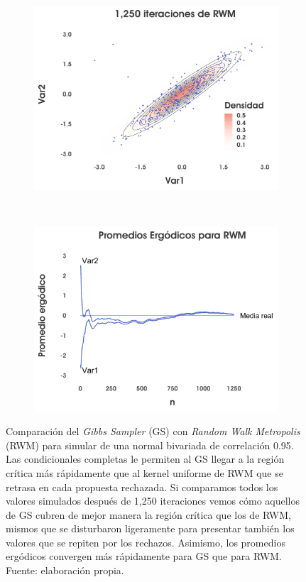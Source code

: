 \begin{figure}
\begin{subfigure}{0.31\textwidth}
        \includegraphics[width=\textwidth]{Figs/Bayes/Ejemplo_RWM_Compara2B}
    \end{subfigure}
    ~
    \begin{subfigure}{0.31\textwidth}
        \includegraphics[width=\textwidth]{Figs/Bayes/Ejemplo_RWM_Compara2C}
    \end{subfigure}
    \caption{Comparación del \textit{Gibbs Sampler} (GS) con \textit{Random Walk Metropolis} (RWM) para simular de una normal bivariada de correlación 0.95. Las condicionales completas le permiten al GS llegar a la región crítica más rápidamente que al kernel uniforme de RWM que se retrasa en cada propuesta rechazada. Si comparamos todos los valores simulados después de 1,250 iteraciones vemos cómo aquellos de GS cubren de mejor manera la región crítica que los de RWM, mismos que se disturbaron ligeramente para presentar también los valores que se repiten por los rechazos. Asimismo, los promedios ergódicos convergen más rápidamente para GS que para RWM. Fuente: elaboración propia.}\label{fig:GS_corr}
\end{figure}

